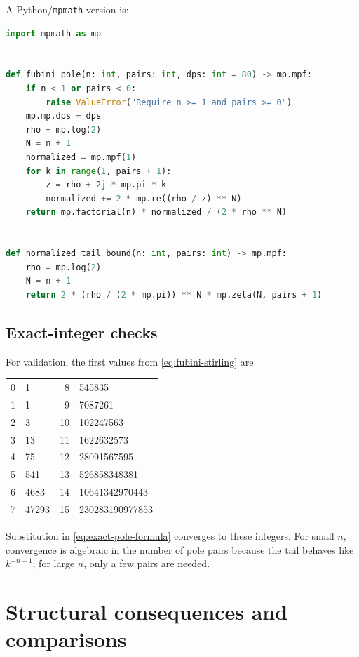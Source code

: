 \documentclass[11pt,oneside]{article}
\numberwithin{equation}{section}
\begin{document}
A Python/\texttt{mpmath} version is:
\begin{lstlisting}[language=Python,caption={Arbitrary-precision evaluation by conjugate pole pairs.}]
import mpmath as mp


def fubini_pole(n: int, pairs: int, dps: int = 80) -> mp.mpf:
    if n < 1 or pairs < 0:
        raise ValueError("Require n >= 1 and pairs >= 0")
    mp.mp.dps = dps
    rho = mp.log(2)
    N = n + 1
    normalized = mp.mpf(1)
    for k in range(1, pairs + 1):
        z = rho + 2j * mp.pi * k
        normalized += 2 * mp.re((rho / z) ** N)
    return mp.factorial(n) * normalized / (2 * rho ** N)


def normalized_tail_bound(n: int, pairs: int) -> mp.mpf:
    rho = mp.log(2)
    N = n + 1
    return 2 * (rho / (2 * mp.pi)) ** N * mp.zeta(N, pairs + 1)
\end{lstlisting}

\subsection{Exact-integer checks}

For validation, the first values from \cref{eq:fubini-stirling} are
\begin{center}
\begin{tabular}{@{}r@{\(\;\mapsto\;\)}l@{\qquad}r@{\(\;\mapsto\;\)}l@{}}
0 & 1 & 8 & 545835\\
1 & 1 & 9 & 7087261\\
2 & 3 & 10 & 102247563\\
3 & 13 & 11 & 1622632573\\
4 & 75 & 12 & 28091567595\\
5 & 541 & 13 & 526858348381\\
6 & 4683 & 14 & 10641342970443\\
7 & 47293 & 15 & 230283190977853\\
\end{tabular}
\end{center}
Substitution in \cref{eq:exact-pole-formula} converges to these integers.  For small \(n\), convergence is algebraic in the number of pole pairs because the tail behaves like \(k^{-n-1}\); for large \(n\), only a few pairs are needed.

\section{Structural consequences and comparisons}
\label{sec:consequences}
\end{document}

